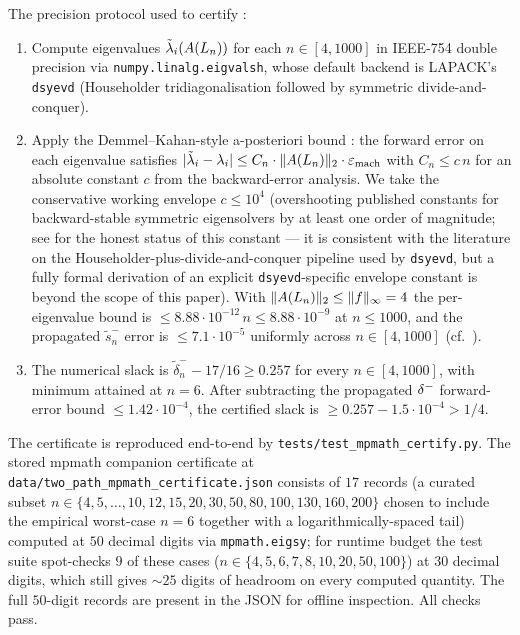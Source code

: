 The precision protocol used to certify :
\begin{enumerate}
\item Compute eigenvalues
$\tilde\lambda_{i}(A(L_{n}))$ for each $n \in [4, 1000]$ in IEEE-754
double precision via \texttt{numpy.linalg.eigvalsh}, whose default
backend is LAPACK's \texttt{dsyevd} (Householder tridiagonalisation
followed by symmetric divide-and-conquer).

\item Apply the Demmel--Kahan-style a-posteriori bound
\cite[Thm.~5.5]{DemmelANLA}: the forward error on each eigenvalue
satisfies $|\tilde\lambda_{i} - \lambda_{i}| \le C_{n} \cdot \|A(L_{n})\|_{2}
\cdot \varepsilon_{\text{mach}}$ with $C_{n} \le c\, n$ for an absolute
constant $c$ from the backward-error analysis. We take the
conservative working envelope $c \le 10^{4}$ (overshooting published
constants for backward-stable symmetric eigensolvers by at least one
order of magnitude; see  for the honest
status of this constant — it is consistent with the literature on
the Householder-plus-divide-and-conquer pipeline used by
\texttt{dsyevd}, but a fully formal derivation of an explicit
\texttt{dsyevd}-specific envelope constant is beyond the scope of this
paper). With $\|A(L_{n})\|_{2} \le \|f\|_{\infty} = 4$ the
per-eigenvalue bound is $\le 8.88 \cdot 10^{-12}\, n \le 8.88 \cdot
10^{-9}$ at $n \le 1000$, and the propagated $\tilde s_{n}^{-}$ error
is $\le 7.1 \cdot 10^{-5}$ uniformly across $n \in [4, 1000]$ (cf.\
).

\item The numerical slack is $\tilde\delta_{n}^{-} - 17/16 \ge 0.257$
for every $n \in [4, 1000]$, with minimum attained at $n = 6$. After
subtracting the propagated $\delta^{-}$ forward-error bound
$\le 1.42 \cdot 10^{-4}$, the certified slack is
$\ge 0.257 - 1.5 \cdot 10^{-4} > 1/4$.
\end{enumerate}
The certificate is reproduced end-to-end by
\texttt{tests/test\_mpmath\_certify.py}. The stored mpmath companion
certificate at
\texttt{data/two\_path\_mpmath\_certificate.json} consists of $17$
records (a curated subset $n \in \{4, 5, \ldots, 10, 12, 15, 20, 30,
50, 80, 100, 130, 160, 200\}$ chosen to include the empirical
worst-case $n = 6$ together with a logarithmically-spaced tail) computed
at $50$ decimal digits via \texttt{mpmath.eigsy}; for runtime budget
the test suite spot-checks $9$ of these cases ($n \in \{4, 5, 6, 7, 8, 10,
20, 50, 100\}$) at $30$ decimal digits, which still gives $\sim 25$
digits of headroom on every computed quantity. The full $50$-digit
records are present in the JSON for offline inspection. All checks
pass.

